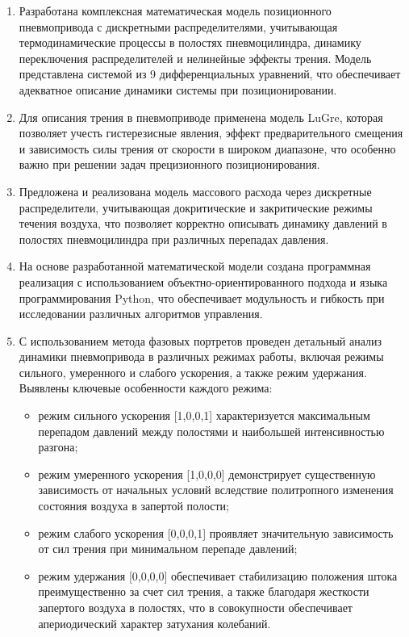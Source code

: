 \begin{enumerate}
    \item Разработана комплексная математическая модель
    позиционного пневмопривода с дискретными распределителями,
    учитывающая термодинамические процессы в полостях пневмоцилиндра,
    динамику переключения распределителей и нелинейные эффекты трения.
    Модель представлена системой из 9 дифференциальных уравнений, что
    обеспечивает адекватное описание динамики системы при позиционировании.
    
    \item Для описания трения в пневмоприводе применена модель LuGre,
    которая позволяет учесть гистерезисные явления, эффект предварительного
    смещения и зависимость силы трения от скорости в широком диапазоне,
    что особенно важно при решении задач прецизионного позиционирования.
    
    \item Предложена и реализована модель массового расхода через дискретные
    распределители, учитывающая докритические и закритические режимы течения
    воздуха, что позволяет корректно описывать динамику давлений в полостях пневмоцилиндра при различных перепадах давления.
    
    \item На основе разработанной математической модели создана программная
    реализация с использованием объектно-ориентированного подхода и языка
    программирования Python, что обеспечивает модульность и гибкость при
    исследовании различных алгоритмов управления.
    
    \item С использованием метода фазовых портретов проведен детальный
    анализ динамики пневмопривода в различных режимах работы, включая
    режимы сильного, умеренного и слабого ускорения, а также режим удержания. Выявлены ключевые особенности каждого режима:
    \begin{itemize}
        \item режим сильного ускорения [1,0,0,1] характеризуется максимальным
        перепадом давлений между полостями и наибольшей интенсивностью разгона;
        \item режим умеренного ускорения [1,0,0,0] демонстрирует существенную
        зависимость от начальных условий вследствие политропного изменения
        состояния воздуха в запертой полости;
        \item режим слабого ускорения [0,0,0,1] проявляет значительную
        зависимость от сил трения при минимальном перепаде давлений;
        \item режим удержания [0,0,0,0] обеспечивает стабилизацию положения
        штока преимущественно за счет сил трения, а также благодаря жесткости
        запертого воздуха в полостях, что в совокупности обеспечивает апериодический характер затухания колебаний.
    \end{itemize}
    

\end{enumerate}
